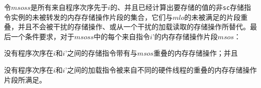 令$msoss$是所有来自程序次序先于$i$的、并且已经计算出要存储的值的非{\tt sc}存储指令实例的未被转发的内存存储操作片段的集合，它们与$mlo$的未被满足的片段重叠，并且不会被干扰的存储操作、或从一个干扰的加载读取的存储操作所替代。最后一个条件要求，对于$msoss$中的每个来自指令$i’$的内存存储操作片段$msos$：
\begin{tightlist}
\item 没有程序次序在$i$和$i’$之间的存储指令带有与$msos$重叠的内存存储操作；并且 %
\item 没有程序次序在$i$和$i’$之间的加载指令被来自不同的硬件线程的重叠的内存存储操作片段所满足。  %
\end{tightlist}

